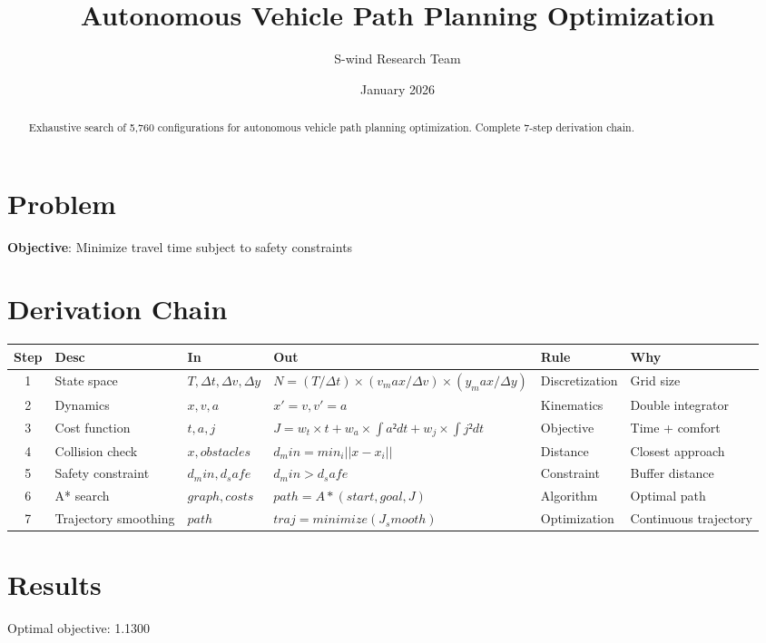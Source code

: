 \documentclass[11pt]{article}
\title{Autonomous Vehicle Path Planning Optimization}
\author{S-wind Research Team}
\date{January 2026}
\begin{document}
\maketitle

\begin{abstract}
Exhaustive search of 5,760 configurations for autonomous vehicle path planning optimization. Complete 7-step derivation chain.
\end{abstract}

\section{Problem}
\textbf{Objective}: Minimize travel time subject to safety constraints

\section{Derivation Chain}
\begin{longtable}{|c|p{2cm}|p{2cm}|p{3cm}|p{2cm}|p{3cm}|}
\hline
Step & Desc & In & Out & Rule & Why\\\hline\endhead
1 & State space & $T, Δt, Δv, Δy$ & $N = (T/Δt)×(v_max/Δv)×(y_max/Δy)$ & Discretization & Grid size\\\hline
2 & Dynamics & $x, v, a$ & $x' = v, v' = a$ & Kinematics & Double integrator\\\hline
3 & Cost function & $t, a, j$ & $J = w_t×t + w_a×∫a²dt + w_j×∫j²dt$ & Objective & Time + comfort\\\hline
4 & Collision check & $x, obstacles$ & $d_min = min_i ||x - x_i||$ & Distance & Closest approach\\\hline
5 & Safety constraint & $d_min, d_safe$ & $d_min > d_safe$ & Constraint & Buffer distance\\\hline
6 & A* search & $graph, costs$ & $path = A*(start, goal, J)$ & Algorithm & Optimal path\\\hline
7 & Trajectory smoothing & $path$ & $traj = minimize(J_smooth)$ & Optimization & Continuous trajectory\\\hline
\end{longtable}

\section{Results}
Optimal objective: 1.1300
\end{document}
